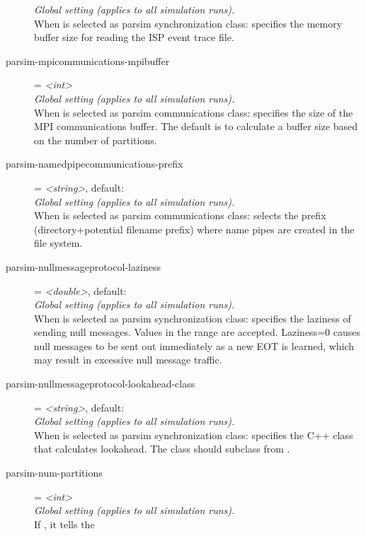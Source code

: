 \begin{description}
    \textit{Global setting (applies to all simulation runs).}\\
    When  is selected as parsim
    synchronization class: specifies the memory buffer size for reading the ISP
    event trace file.
\item[parsim-mpicommunications-mpibuffer] = \textit{<int>}\\
    \textit{Global setting (applies to all simulation runs).}\\
    When  is selected as parsim communications class:
    specifies the size of the MPI communications buffer. The default is to
    calculate a buffer size based on the number of partitions.
\item[parsim-namedpipecommunications-prefix] = \textit{<string>}, default: \\
    \textit{Global setting (applies to all simulation runs).}\\
    When  is selected as parsim
    communications class: selects the prefix (directory+potential filename
    prefix) where name pipes are created in the file system.
\item[parsim-nullmessageprotocol-laziness] = \textit{<double>}, default: \\
    \textit{Global setting (applies to all simulation runs).}\\
    When  is selected as parsim synchronization
    class: specifies the laziness of sending null messages. Values in the range
    \ttt{[0,{\allowbreak}1)} are accepted. Laziness=0 causes null messages to
    be sent out immediately as a new EOT is learned, which may result in
    excessive null message traffic.
\item[parsim-nullmessageprotocol-lookahead-class] = \textit{<string>}, default: \\
    \textit{Global setting (applies to all simulation runs).}\\
    When  is selected as parsim synchronization
    class: specifies the C++ class that calculates lookahead. The class should
    subclass from .
\item[parsim-num-partitions] = \textit{<int>}\\
    \textit{Global setting (applies to all simulation runs).}\\
    If , it tells the

\end{description}
